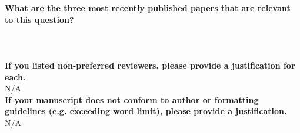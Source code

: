 \documentclass{article}\usepackage[]{graphicx}\usepackage[]{color}
\begin{document}
\noindent \textbf{What are the three most recently published papers that are relevant to this question?} \\

\\
\\ 
\\  

\noindent \textbf{ If you listed non-preferred reviewers, please provide a justification for each.} \\

\noindent N/A \\

\noindent \textbf{ If your manuscript does not conform to author or formatting guidelines (e.g. exceeding word limit), please provide a justification.} \\

\noindent N/A \\



\end{document}

